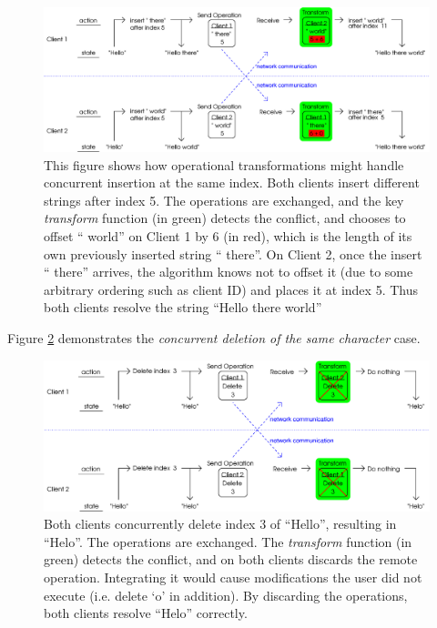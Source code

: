 \documentclass[12pt,a4paper,twoside,openright]{report}
\begin{document}
	\begin{figure}[H]
	\centering
	\includegraphics[width=1\linewidth]{figs/ot1.eps}
	\caption[Operational Transformations -- concurrent insertion]{This figure shows how operational transformations might handle concurrent insertion at the same index. Both clients insert different strings after index 5. The operations are exchanged, and the key \textit{transform} function (in green) detects the conflict, and chooses to offset `` world'' on Client 1 by 6 (in red), which is the length of its own previously inserted string `` there''. On Client 2, once the insert `` there'' arrives, the algorithm knows not to offset it (due to some arbitrary ordering such as client ID) and places it at index 5. Thus both clients resolve the string ``Hello there world''}
	\label{fig:ot1}
	\end{figure}
	
	Figure \ref{fig:ot2} demonstrates the \textit{concurrent deletion of the same character} case.

	\begin{figure}[H]
	\centering
	\includegraphics[width=1\linewidth]{figs/ot2.eps}
	\caption[Operational Transformations -- concurrent deletion]{Both clients concurrently delete index 3 of ``Hello'', resulting in ``Helo''. The operations are exchanged. The \textit{transform} function (in green) detects the conflict, and on both clients discards the remote operation. Integrating it would cause modifications the user did not execute (i.e. delete `o' in addition). By discarding the operations, both clients resolve ``Helo'' correctly.}
	\label{fig:ot2}
	\end{figure}
	
\end{document}
